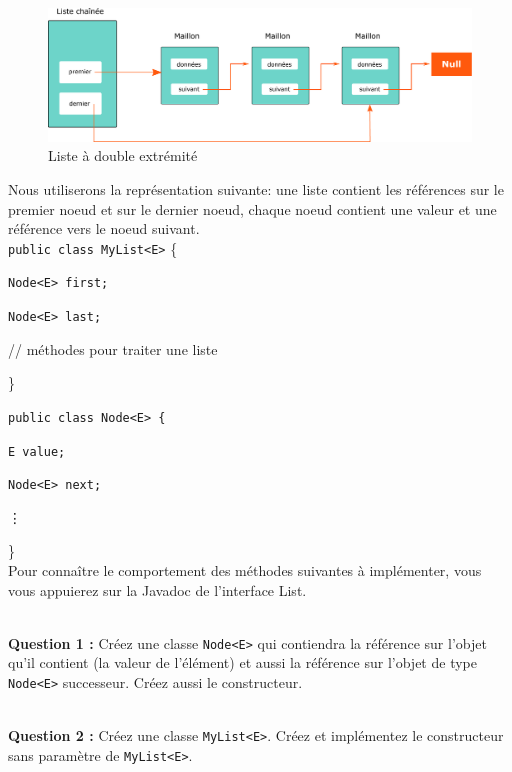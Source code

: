 \documentclass[iutinfo,a4paper,nocorrections,10pt]{ustl-tdtp}
\begin{document}
\begin{figure}[!h]
\centering
\label{tableau}
\includegraphics[scale=0.5]{figs/linked_list_double_ended}
\caption{Liste à double extrémité}
\label{fig:double-ended}
\end{figure}

Nous utiliserons la représentation suivante: une liste contient les références sur le premier noeud et sur le dernier noeud, chaque noeud contient une valeur et une référence vers le noeud suivant. 
~\\
	\texttt{public class MyList<E>} \{
	\begin{description}
		\item \texttt{Node<E> first;}
		\item \texttt{Node<E> last;}


		\item // méthodes pour traiter une liste
		\end{description}
	\}
	

	\texttt{public class Node<E> 
	\{ }
	\begin{description}
	
	\item	\texttt{E value;}
\item		\texttt{Node<E> next;}
\end{description}
	
\vdots

		
\}
~\\
		
		
Pour connaître le comportement des méthodes suivantes à implémenter, vous vous appuierez sur la Javadoc de l'interface List.

~\\ \textbf{Question 1 :} Créez une classe \texttt{Node<E>} qui
contiendra la référence sur l'objet qu'il contient (la valeur de l'élément) et aussi la
référence sur l'objet de type \texttt{Node<E>} successeur. Créez aussi
le constructeur.

~\\ \textbf{Question 2 :} Créez une classe \texttt{MyList<E>}. Créez et implémentez le constructeur sans paramètre de \texttt{MyList<E>}.
\end{document}
